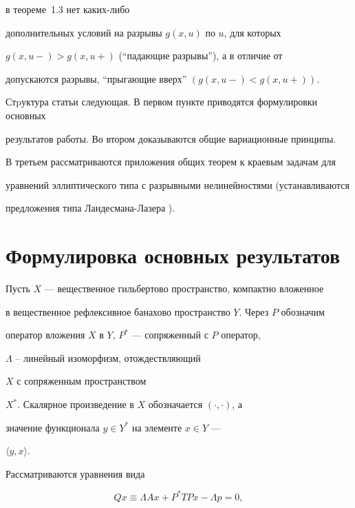 в теореме~1.3 нет каких-либо


дополнительных условий на разрывы $g(x,u)$ по $u$, для которых


$g(x,u-) > g(x,u+)$ (``падающие разрывы''), а в отличие от \cite{n12}


допускаются разрывы, ``прыгающие вверх'' $(g(x,u-) < g(x,u+))$.





Стpуктура статьи следующая. В первом пункте приводятся формулировки основных


результатов работы. Во втором доказываются общие вариационные принципы.


В третьем рассматриваются приложения общих теорем к краевым задачам для


уравнений эллиптического типа с разрывными нелинейностями (устанавливаются


предложения типа Ландесмана-Лазера \cite{n3}).





\section{Формулировка основных результатов}





Пусть $X$ --- вещественное гильбертово пространство, компактно вложенное


в вещественное рефлексивное банахово пространство $Y$. Через $P$ обозначим


оператор вложения $X$ в $Y$, $P^{*}$ --- сопряженный с $P$ оператор,


$\Lambda$ -- линейный изоморфизм, отождествляющий


$X$ с сопряженным пространством


$X^{*}$. Скалярное произведение в $X$ обозначается $(\cdot , \cdot)$, а


значение функционала $y \in Y^{*}$ на элементе $x\in Y$ ---


$\langle y,x \rangle $.


Рассматриваются уравнения вида


\begin{equation}


Qx \equiv \Lambda Ax + P^{*}TPx - \Lambda p = 0,\label{eq1.1}


\end{equation}


